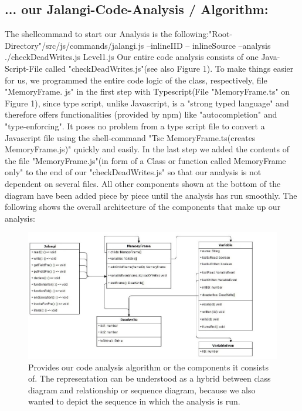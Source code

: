 \documentclass[a4paper]{scrartcl}
\begin{document}
\subsection{... our Jalangi-Code-Analysis / Algorithm:}
The shellcommand to start our Analysis is the following:\newline "Root-Directory"/src/js/commands/jalangi.js --inlineIID -- inlineSource --analysis ./checkDeadWrites.js Level1.js\newline
Our entire code analysis consists of one Java-Script-File called "checkDeadWrites.js"(see also Figure 1).
To make things easier for us, we programmed the entire code logic  of the class, respectively, file "MemoryFrame. js" in the first step with Typescript(File "MemoryFrame.ts" on Figure 1), since type script, unlike Javascript, is a "strong typed language" and therefore offers functionalities (provided by npm) like "autocompletion" and "type-enforcing". It poses no problem from a type script file to convert a Javascript file using the shell-command "Tsc MemoryFrame.ts(creates MemoryFrame.js)" quickly and easily. In the last step we added the contents of the file "MemoryFrame.js"(in form of a Class or function called MemoryFrame only" to the end of our "checkDeadWrites.js" so that our analysis is not dependent on several files. 
All other components shown at the bottom of the diagram have been added piece by piece until the analysis has run smoothly.
The following shows the overall architecture of the components that make up our analysis:
\begin{figure}[!htb]
	\centering
	\includegraphics[width=1.1\linewidth]{WorkflowDiagram.jpg}
	\caption{Provides our code analysis algorithm or the components it consists of. The representation can be understood as a hybrid between class diagram and relationship or sequence diagram, because we also wanted to depict the sequence in which the analysis is run.}
	\label{img:grafik-dummy}
\end{figure}
\newpage
\end{document}

